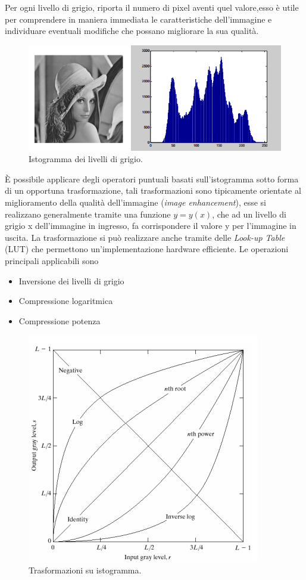 Per ogni livello di grigio, riporta il numero di pixel 
aventi quel valore,esso è utile per comprendere in maniera 
immediata le caratteristiche dell'immagine e 
individuare eventuali modifiche che possano 
migliorare la sua qualità.
\begin{figure}
\centering
\includegraphics[width=.5\textwidth]{img/histogramma.png}
\caption{Istogramma dei livelli di grigio.}\label{fig:istogramma}
\end{figure}
\`{E} possibile applicare degli operatori puntuali basati sull'istogramma sotto forma di un opportuna trasformazione, tali trasformazioni sono tipicamente orientate al miglioramento della qualità dell'immagine (\emph{image enhancement}), esse si realizzano generalmente tramite una funzione 
$y=y(x)$, che ad un livello di grigio x dell'immagine in 
ingresso, fa corrispondere il valore y per l'immagine 
in uscita. La trasformazione si può realizzare anche tramite delle 
\emph{Look-up Table} (LUT) che permettono 
un'implementazione hardware efficiente.
Le operazioni principali applicabili sono
\begin{itemize}
\item Inversione dei livelli di grigio
\item Compressione logaritmica
\item Compressione potenza
\end{itemize}
\begin{figure}[h]
\centering
\includegraphics[width=.5\textwidth]{img/trasformazione-istogramma.png}
\caption{Trasformazioni su istogramma.}\label{fig:trasformazione-istogramma}
\end{figure}
